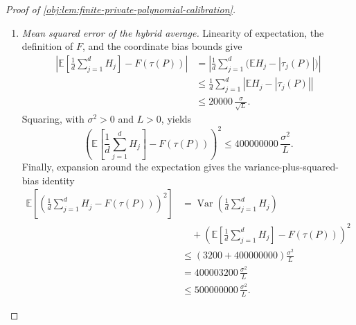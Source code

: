 \documentclass[11pt]{article}
\begin{document}
\begin{proof}[Proof of \cref{obj:lem:finite-private-polynomial-calibration}]
\begin{enumerate}
We absorb the dimension factor using \(L\ge4096\). The elementary exponential lower bound gives
\[
\frac L4\le e^{L/4},
\qquad
L^2\le16e^{L/2},
\]
and
\[
4\le\frac{49L}{100}
=1+\left(\frac{49L}{100}-1\right)
\le e^{49L/100-1}.
\]
Since \(e^{L-1}=d\), it follows that
\[
\begin{aligned}
L^2e^{L/100}
&\le16e^{L/2}e^{L/100}\\
&=16e^{51L/100}\\
&\le4e^{51L/100}e^{49L/100-1}
=4d.
\end{aligned}
\]
As \(d,L>0\), this proves
\[
\frac{800\sigma^2Le^{L/100}}d
\le\frac{3200\sigma^2}{L},
\qquad
\operatorname{Var}\left(\frac1d\sum_{j=1}^dH_j\right)
\le\frac{3200\sigma^2}{L}.
\]

\item \textit{Mean squared error of the hybrid average.}
Linearity of expectation, the definition of \(F\), and the coordinate bias bounds give
\[
\begin{aligned}
\left|\mathbb E\left[\frac1d\sum_{j=1}^dH_j\right]
      -F(\tau(P))\right|
&=\left|\frac1d\sum_{j=1}^d
       \bigl(\mathbb EH_j-|\tau_j(P)|\bigr)\right|\\
&\le\frac1d\sum_{j=1}^d
       \left|\mathbb EH_j-|\tau_j(P)|\right|\\
&\le20000\,\frac{\sigma}{\sqrt L}.
\end{aligned}
\]
Squaring, with \(\sigma^2>0\) and \(L>0\), yields
\[
\left(\mathbb E\left[\frac1d\sum_{j=1}^dH_j\right]
      -F(\tau(P))\right)^2
\le400000000\,\frac{\sigma^2}{L}.
\]
Finally, expansion around the expectation gives the variance-plus-squared-bias identity
\[
\begin{aligned}
\mathbb E\left[
 \left(\frac1d\sum_{j=1}^dH_j-F(\tau(P))\right)^2\right]
&=\operatorname{Var}\left(\frac1d\sum_{j=1}^dH_j\right)\\
&\quad+\left(\mathbb E\left[\frac1d\sum_{j=1}^dH_j\right]
             -F(\tau(P))\right)^2\\
&\le(3200+400000000)\frac{\sigma^2}{L}\\
&=400003200\,\frac{\sigma^2}{L}\\
&\le500000000\,\frac{\sigma^2}{L}.
\end{aligned}
\]
\end{enumerate}
\end{proof}
\end{document}
